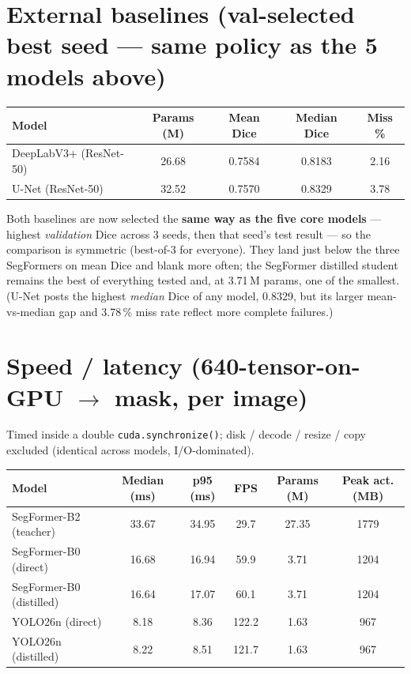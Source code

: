 \documentclass[11pt]{article}
\begin{document}
\section{External baselines (val-selected best seed --- same policy as the 5 models above)}

\begin{center}
\begin{tabular}{lcccc}
\toprule
Model & Params (M) & Mean Dice & Median Dice & Miss \% \\
\midrule
DeepLabV3+ (ResNet-50)  & 26.68 & 0.7584 & 0.8183 & 2.16 \\
U-Net (ResNet-50)       & 32.52 & 0.7570 & 0.8329 & 3.78 \\
\bottomrule
\end{tabular}
\end{center}

Both baselines are now selected the \textbf{same way as the five core models}
--- highest \emph{validation} Dice across 3 seeds, then that seed's test result
--- so the comparison is symmetric (best-of-3 for everyone). They land just
below the three SegFormers on mean Dice and blank more often; the SegFormer
distilled student remains the best of everything tested and, at 3.71\,M params,
one of the smallest. (U-Net posts the highest \emph{median} Dice of any model,
0.8329, but its larger mean-vs-median gap and 3.78\,\% miss rate reflect more
complete failures.)

\section{Speed / latency (640-tensor-on-GPU $\to$ mask, per image)}

Timed inside a double \texttt{cuda.synchronize()}; disk / decode / resize /
copy excluded (identical across models, I/O-dominated).

\begin{center}
\begin{tabular}{lccccc}
\toprule
Model & Median (ms) & p95 (ms) & FPS & Params (M) & Peak act. (MB) \\
\midrule
SegFormer-B2 (teacher)   & 33.67 & 34.95 & 29.7  & 27.35 & 1779 \\
SegFormer-B0 (direct)    & 16.68 & 16.94 & 59.9  & 3.71  & 1204 \\
SegFormer-B0 (distilled) & 16.64 & 17.07 & 60.1  & 3.71  & 1204 \\
YOLO26n (direct)         & 8.18  & 8.36  & 122.2 & 1.63  & 967  \\
YOLO26n (distilled)      & 8.22  & 8.51  & 121.7 & 1.63  & 967  \\
\bottomrule
\end{tabular}
\end{center}
\end{document}
